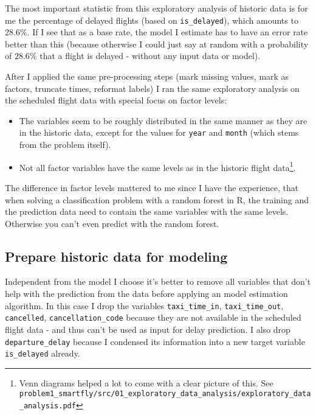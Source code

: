 \documentclass{article}\usepackage[]{graphicx}\usepackage[]{color}
\begin{document}
The most important statistic from this exploratory analysis of historic data is for me the percentage of delayed flights (based on \verb+is_delayed+), which amounts to $28.6\%$. If I see that as a base rate, the model I estimate has to have an error rate better than this (because otherwise I could just say at random with a probability of $28.6\%$ that a flight is delayed - without any input data or model).

After I applied the same pre-processing steps (mark missing values, mark as factors, truncate times, reformat labels) I ran the same exploratory analysis on the scheduled flight data with special focus on factor levels:
\begin{itemize}
	\item The variables seem to be roughly distributed in the same manner as they are in the historic data, except for the values for \verb+year+ and \verb+month+ (which stems from the problem itself).
	\item Not all factor variables have the same levels as in the historic flight data\footnote{Venn diagrams helped a lot to come with a clear picture of this. See \verb+problem1_smartfly/src/01_exploratory_data_analysis/exploratory_data_analysis.pdf+}.
\end{itemize}

The difference in factor levels mattered to me since I have the experience, that when solving a classification problem with a random forest in R, the training and the prediction data need to contain the same variables with the same levels. Otherwise you can't even predict with the random forest.


\subsection{Prepare historic data for modeling} %
\label{sub:prepare_historic_data_for_modeling}
Independent from the model I choose it's better to remove all variables that don't help with the prediction from the data before applying an model estimation algorithm. In this case I drop the variables \verb+taxi_time_in+, \verb+taxi_time_out+, \verb+cancelled+, \verb+cancellation_code+ because they are not available in the scheduled flight data - and thus can't be used as input for delay prediction. I also drop \verb+departure_delay+ because I condensed its information into a new target variable \verb+is_delayed+ already.
\end{document}
